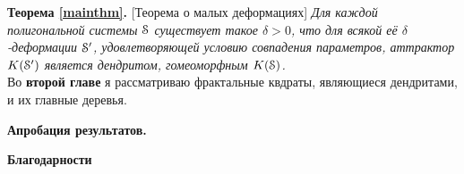 {\bf Теорема \ref{mainthm}.} [Теорема о малых деформациях]
{\em Для каждой полигональной системы ${\EuScript S}$ существует такое $\delta > 0$, что для всякой её $\delta$-деформации ${\EuScript S}'$, удовлетворяющей условию совпадения параметров, аттрактор $K({\EuScript S}')$ является дендритом, гомеоморфным $K({\EuScript S})$.}\\


Во {\bf второй главе} я рассматриваю фрактальные квдраты, являющиеся дендритами, и их главные деревья.

\begin{center}
\textbf{Апробация результатов.}
\end{center}


\begin{center}
\textbf{Благодарности}
\end{center}




